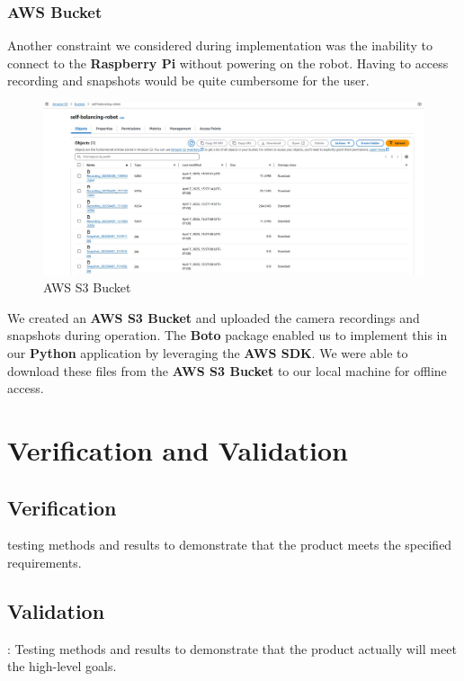 \documentclass{article}
\begin{document}
\subsubsection{AWS Bucket}

\begin{minipage}{\linewidth}
    Another constraint we considered during implementation was the inability to
    connect to the \textbf{Raspberry Pi} without powering on the robot. Having to access recording and snapshots
    would be quite cumbersome for the user. \\
\end{minipage}

\begin{figure}[H]
    \centering
    \includegraphics[width=1\textwidth]{Figures/S3Bucket_Files.jpg}
    \caption{AWS S3 Bucket}
    \label{fig:s3_bucket}
\end{figure}

\begin{minipage}{\linewidth}
    We created an \textbf{AWS S3 Bucket} and uploaded the camera recordings and snapshots during operation.
    The \textbf{Boto} package enabled us to implement this in our \textbf{Python} application by leveraging the \textbf{AWS SDK}.
    We were able to download these files from the \textbf{AWS S3 Bucket} to our local machine for offline access.
\end{minipage}

\section{Verification and Validation}
\subsection{Verification}
testing methods and results to demonstrate that the product meets the specified requirements. \\
\subsection{Validation}: Testing methods and results to demonstrate that the product actually will meet the high-level goals.
\end{document}
